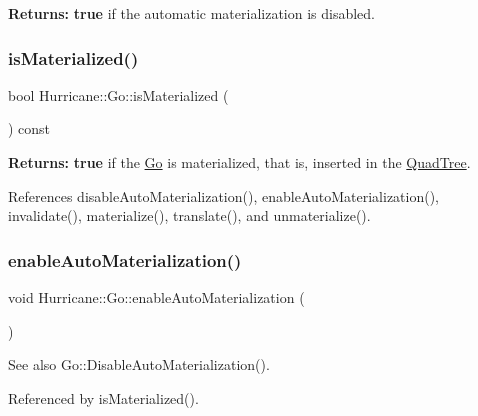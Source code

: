 {\bfseries Returns\+:} {\bfseries true} if the automatic materialization is disabled. \mbox{\label{classHurricane_1_1Go_a0fd2574d3e2e0157230209acdc1b8aa6}} 
\subsubsection{\texorpdfstring{is\+Materialized()}{isMaterialized()}}
{\footnotesize\ttfamily bool Hurricane\+::\+Go\+::is\+Materialized (\begin{DoxyParamCaption}{ }\end{DoxyParamCaption}) const\hspace{0.3cm}{\ttfamily [inline]}}

{\bfseries Returns\+:} {\bfseries true} if the \hyperlink{classHurricane_1_1Go}{Go} is materialized, that is, inserted in the \hyperlink{classHurricane_1_1QuadTree}{Quad\+Tree}. 

References disable\+Auto\+Materialization(), enable\+Auto\+Materialization(), invalidate(), materialize(), translate(), and unmaterialize().

\mbox{\label{classHurricane_1_1Go_ab0b1ca3c606247e1ebd7cab8fa828b04}} 
\subsubsection{\texorpdfstring{enable\+Auto\+Materialization()}{enableAutoMaterialization()}}
{\footnotesize\ttfamily void Hurricane\+::\+Go\+::enable\+Auto\+Materialization (\begin{DoxyParamCaption}{ }\end{DoxyParamCaption})\hspace{0.3cm}{\ttfamily [static]}}

\begin{DoxySeeAlso}{See also}
Go\+::\+Disable\+Auto\+Materialization(). 
\end{DoxySeeAlso}


Referenced by is\+Materialized().

\mbox{\label{classHurricane_1_1Go_a0d49d22a3788e8001e58152e62b9f3cc}} 

